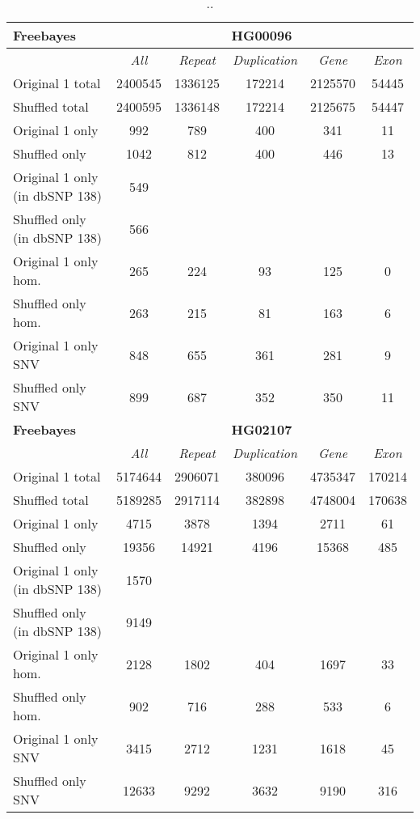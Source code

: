 \begin{table}[htb]
\begin{center}
\begin{tabular}{|l|c||c|c|c|c|}
\hline
{\bf Freebayes} & \multicolumn{5}{|c|}{\bf HG00096} \\
\hline
\cline{2-6}
{\bf} & {\it All} & {\it Repeat} & {\it Duplication} & {\it Gene} & {\it Exon} \\
\hline
Original 1 total & 2400545 & 1336125 & 172214 & 2125570 & 54445\\ 
\hline
Shuffled total & 2400595 & 1336148 & 172214 & 2125675 & 54447\\ 
\hline
Original 1 only & 992 & 789 & 400 & 341 & 11\\ 
\hline
Shuffled only & 1042 & 812 & 400 & 446 & 13\\ 
\hline
Original 1 only (in dbSNP 138) & 549 &  &  &  & \\ 
\hline
Shuffled only (in dbSNP 138) & 566 &  &  &  & \\ 
\hline
Original 1 only hom. & 265 & 224 & 93 & 125 & 0\\ 
\hline
Shuffled only hom. & 263 & 215 & 81 & 163 & 6\\ 
\hline
Original 1 only SNV & 848 & 655 & 361 & 281 & 9\\ 
\hline
Shuffled only SNV & 899 & 687 & 352 & 350 & 11\\ 
\hline
\hline
{\bf Freebayes} & \multicolumn{5}{|c|}{\bf HG02107} \\
\hline
\cline{2-6}
{\bf} & {\it All} & {\it Repeat} & {\it Duplication} & {\it Gene} & {\it Exon} \\
\hline
Original 1 total & 5174644 & 2906071 & 380096 & 4735347 & 170214\\ 
\hline
Shuffled total & 5189285 & 2917114 & 382898 & 4748004 & 170638\\ 
\hline
Original 1 only & 4715 & 3878 & 1394 & 2711 & 61\\ 
\hline
Shuffled only & 19356 & 14921 & 4196 & 15368 & 485\\ 
\hline
Original 1 only (in dbSNP 138) & 1570 &  &  &  & \\ 
\hline
Shuffled only (in dbSNP 138) & 9149 &  &  &  & \\ 
\hline
Original 1 only hom. & 2128 & 1802 & 404 & 1697 & 33\\ 
\hline
Shuffled only hom. & 902 & 716 & 288 & 533 & 6\\ 
\hline
Original 1 only SNV & 3415 & 2712 & 1231 & 1618 & 45\\ 
\hline
Shuffled only SNV & 12633 & 9292 & 3632 & 9190 & 316\\  
\hline
\end{tabular}
\end{center}
\caption{ .. }
\label{tab:orig-vs-shuf-freebayes}
\end{table}

